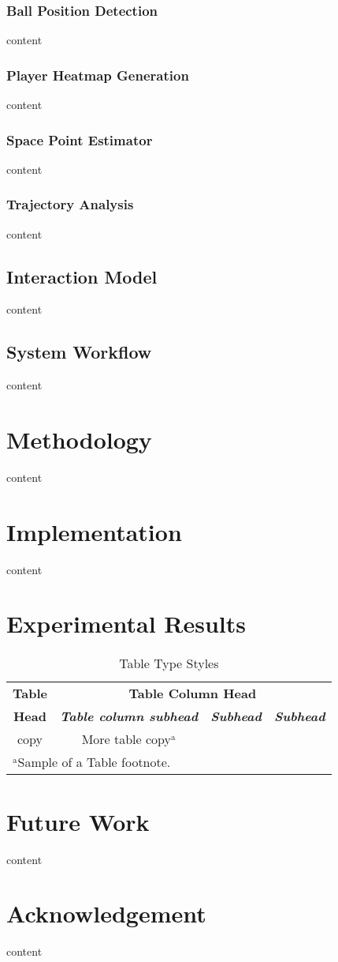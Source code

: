 \documentclass[conference]{IEEEtran}
\begin{document}
\subsubsection{Ball Position Detection}
content
\subsubsection{Player Heatmap Generation}
content
\subsubsection{Space Point Estimator}
content
\subsubsection{Trajectory Analysis}
content
\subsection{Interaction Model}
content
\subsection{System Workflow}
content
\section{Methodology}
content
\section{Implementation}
content
\section{Experimental Results}
\begin{table}[htbp]
\caption{Table Type Styles}
\begin{center}
\begin{tabular}{|c|c|c|c|}
\hline
\textbf{Table}&\multicolumn{3}{|c|}{\textbf{Table Column Head}} \\
\cline{2-4} 
\textbf{Head} & \textbf{\textit{Table column subhead}}& \textbf{\textit{Subhead}}& \textbf{\textit{Subhead}} \\
\hline
copy& More table copy$^{\mathrm{a}}$& &  \\
\hline
\multicolumn{4}{l}{$^{\mathrm{a}}$Sample of a Table footnote.}
\end{tabular}
\label{tab1}
\end{center}
\end{table}

\section{Future Work}
content
\section{Acknowledgement}
content

\end{document}
